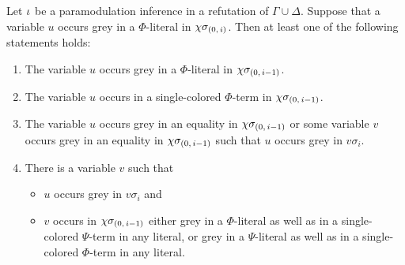 \documentclass[,%
	draft=false,%
	numbers=noendperiod
	12pt,
	a4paper,
	oneside,%
	openany,
]{memoir}
\newcommand{\inv}{\ensuremath{\chi}}
\begin{document}
\begin{lemma}
	\label{lemma:var_grey_col_lit_paramod}
	Let $\iota$ be a paramodulation inference in a refutation of $\Gamma\cup\Delta$.
	Suppose that a variable $u$ occurs grey in a $\Phi$-literal in $\inv\sigmazi$.
	Then at least one of the following statements holds:
	\begin{enumerate}
		\item
			\label{16_1}
			The variable $u$ occurs grey in a $\Phi$-literal in $\inv\sigmazmi$.

		\item
			\label{16_5}
			The variable $u$ occurs in a single-colored $\Phi$-term in $\inv\sigmazmi$.

		\item
			\label{16_6}
			The variable $u$ occurs grey in an equality in $\inv\sigmazmi$
			or 
			some variable $v$ occurs grey in an equality in $\inv\sigmazmi$ such that $u$ occurs grey in $v\sigma_i$.






		\item 
			\label{16_3}
			There is a variable $v$ such that
			{
				\renewcommand{\labelitemi}{\textendash}
				\begin{itemize}
					\item $u$ occurs grey in $v\sigma_i$ and
					\item
						$v$ occurs in $\inv\sigmazmi$
						either grey in a $\Phi$-literal as well as in a single-colored $\Psi$-term in any literal, 
						or grey in a $\Psi$-literal as well as in a single-colored $\Phi$-term in any literal.
				\end{itemize}
			}


	\end{enumerate}
\end{lemma}
\end{document}
